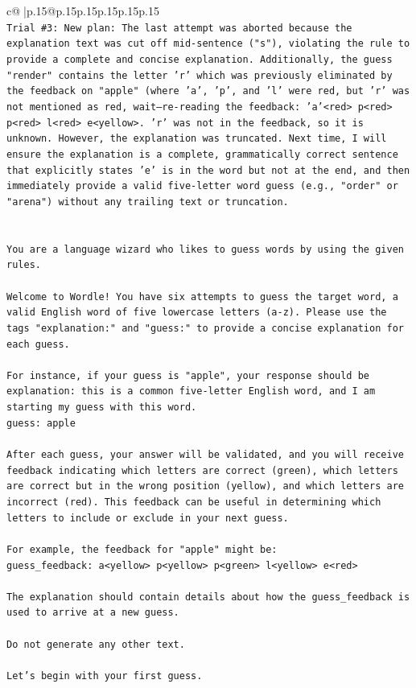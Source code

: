 \documentclass{article}
\begin{document}
{\begin{supertabular}{c@{$\;$}|p{.15\linewidth}@{}p{.15\linewidth}p{.15\linewidth}p{.15\linewidth}p{.15\linewidth}p{.15\linewidth}}
{{{\\ 
\texttt{Trial \#3: New plan: The last attempt was aborted because the explanation text was cut off mid{-}sentence ("s"), violating the rule to provide a complete and concise explanation. Additionally, the guess "render" contains the letter 'r' which was previously eliminated by the feedback on "apple" (where 'a', 'p', and 'l' were red, but 'r' was not mentioned as red, wait—re{-}reading the feedback: 'a'<red> p<red> p<red> l<red> e<yellow>. 'r' was not in the feedback, so it is unknown. However, the explanation was truncated. Next time, I will ensure the explanation is a complete, grammatically correct sentence that explicitly states 'e' is in the word but not at the end, and then immediately provide a valid five{-}letter word guess (e.g., "order" or "arena") without any trailing text or truncation.} \\
\\ 
\\ 
\texttt{You are a language wizard who likes to guess words by using the given rules.} \\
\\ 
\texttt{Welcome to Wordle! You have six attempts to guess the target word, a valid English word of five lowercase letters (a{-}z). Please use the tags "explanation:" and "guess:" to provide a concise explanation for each guess.} \\
\\ 
\texttt{For instance, if your guess is "apple", your response should be} \\
\texttt{explanation: this is a common five{-}letter English word, and I am starting my guess with this word.} \\
\texttt{guess: apple} \\
\\ 
\texttt{After each guess, your answer will be validated, and you will receive feedback indicating which letters are correct (green), which letters are correct but in the wrong position (yellow), and which letters are incorrect (red). This feedback can be useful in determining which letters to include or exclude in your next guess.} \\
\\ 
\texttt{For example, the feedback for "apple" might be:} \\
\texttt{guess\_feedback: a<yellow> p<yellow> p<green> l<yellow> e<red>} \\
\\ 
\texttt{The explanation should contain details about how the guess\_feedback is used to arrive at a new guess.} \\
\\ 
\texttt{Do not generate any other text.} \\
\\ 
\texttt{Let's begin with your first guess.} \\
            }
        }
    }
     \\ \\


\end{supertabular}}
\end{document}
